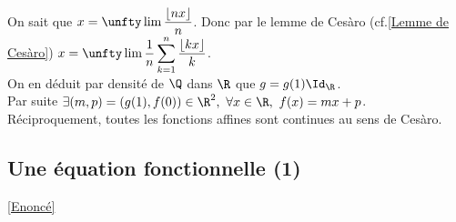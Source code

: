 \documentclass{book}
\begin{document}
\begin{enumerate}[leftmargin=*]
		On sait que $x=\unfty\lim\dfrac{\lfloor nx\rfloor}{n}$. Donc par le lemme de Cesàro (cf.\ref{Lemme de Cesàro}) $x=\displaystyle\unfty\lim\frac{1}{n}\sum_{k=1}^n\frac{\lfloor kx\rfloor}{k}$.\\
		On en déduit par densité de $\Q$ dans $\R$ que $g=g(1)\Id_\R$.\\
		Par suite $\exists (m,p)=(g(1),f(0))\in \R^2,\ \forall x\in \R,\ f(x)=mx+p$.\\
		Réciproquement, toutes les fonctions affines sont continues au sens de Cesàro.
	\end{enumerate}
	
	\subsection{Une équation fonctionnelle (1) }
	\label{Une équation fonctionnelle (1) corrigé}
	\textcolor{blue}{\hyperref[Une équation fonctionnelle (1)]{[Enoncé]}}\\
\end{document}
